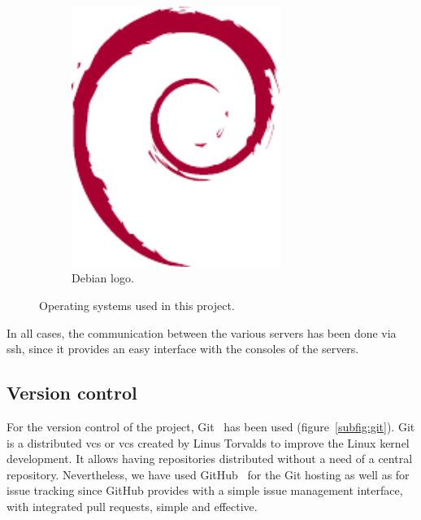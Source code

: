 \begin{figure}[!htbp]
\begin{subfigure}{0.3\textwidth}
		\includegraphics[width=0.75\textwidth]{fig/debian}
		\caption{Debian logo.}\label{subfig:debian}
	\end{subfigure}\quad
	\caption{Operating systems used in this project.}
\end{figure}

In all cases, the communication between the various servers has been done via \acrshort{ssh}, since
it provides an easy interface with the consoles of the servers.

\subsection{Version control}

For the version control of the project, Git~\cite{git_web} has been used (figure~\ref{subfig:git}).
Git is a distributed \acrlong{vcs} or \acrshort{vcs} created by Linus Torvalds to improve the Linux
kernel development. It allows having repositories distributed without a need of a central
repository. Nevertheless, we have used GitHub~\cite{github_web} for the Git hosting as well as for
issue tracking since GitHub provides with a simple issue management interface, with integrated pull
requests, simple and effective.

